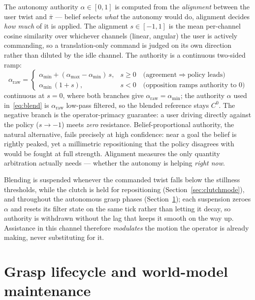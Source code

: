 \documentclass[12pt,a4paper,twoside,openright]{report}
\begin{document}
The autonomy authority $\alpha \in [0,1]$ is computed from the \emph{alignment} between the user twist and $\bar{\pi}$ --- belief selects \emph{what} the autonomy would do, alignment decides \emph{how much} of it is applied. The alignment $s \in [-1,1]$ is the mean per-channel cosine similarity over whichever channels (linear, angular) the user is actively commanding, so a translation-only command is judged on its own direction rather than diluted by the idle channel. The authority is a continuous two-sided ramp:
\begin{equation}
\alpha_{\text{raw}} =
\begin{cases}
\alpha_{\min} + (\alpha_{\max} - \alpha_{\min})\, s, & s \ge 0 \quad \text{(agreement} \Rightarrow \text{policy leads)}\\[2pt]
\alpha_{\min}\,(1 + s), & s < 0 \quad \text{(opposition ramps authority to } 0\text{)}
\end{cases}
\label{eq:alpha}
\end{equation}
continuous at $s{=}0$, where both branches give $\alpha_{\text{raw}} = \alpha_{\min}$; the authority $\alpha$ used in~\eqref{eq:blend} is $\alpha_{\text{raw}}$ low-pass filtered, so the blended reference stays $C^0$. The negative branch is the operator-primacy guarantee: a user driving directly against the policy ($s \to -1$) meets \emph{zero} resistance. Belief-proportional authority, the natural alternative, fails precisely at high confidence: near a goal the belief is rightly peaked, yet a millimetric repositioning that the policy disagrees with would be fought at full strength. Alignment measures the only quantity arbitration actually needs --- whether the autonomy is helping \emph{right now}.

Blending is suspended whenever the commanded twist falls below the stillness thresholds, while the clutch is held for repositioning (Section~\ref{sec:clutchmode}), and throughout the autonomous grasp phases (Section~\ref{sec:grasp}); each suspension zeroes $\alpha$ and resets its filter state on the same tick rather than letting it decay, so authority is withdrawn without the lag that keeps it smooth on the way up. Assistance in this channel therefore \emph{modulates} the motion the operator is already making, never substituting for it.

\section{Grasp lifecycle and world-model maintenance}
\label{sec:grasp}
\end{document}
